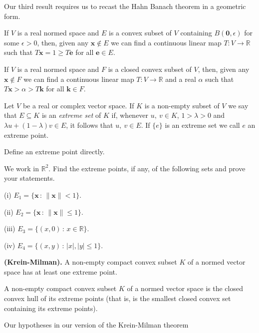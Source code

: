 Our third result requires us to recast 
the Hahn Banach theorem in a geometric form.
\begin{lemma}\label{L;geometrical Banach} 
If $V$ is a real normed space
and $E$ is a convex subset of $V$ containing
$B({\boldsymbol 0},\epsilon)$ for some $\epsilon>0$,
then, given any ${\mathbf x}\notin E$ we can find
a continuous linear map $T:V\rightarrow{\mathbb R}$
such that $T{\mathbf x}=1\geq T{\mathbf e}$ for
all ${\mathbf e}\in E$.
\end{lemma}
\begin{theorem} 
If $V$ is a real normed space
and $F$ is a closed convex subset of $V$,
then, given any ${\mathbf x}\notin F$ we can find
a continuous linear map $T:V\rightarrow{\mathbb R}$
and a real $\alpha$
such that $T{\mathbf x}>\alpha>T{\mathbf k}$ for
all ${\mathbf k}\in F$.
\end{theorem}
\begin{definition} Let $V$ be a real or complex
vector space. If $K$ is a non-empty subset of $V$
we say that $E\subseteq K$ is an \emph{extreme set}
of $K$ if, whenever $u,\ v\in K$, $1>\lambda>0$
and $\lambda u+(1-\lambda)v\in E$, it follows that
$u,\ v\in E$. If $\{e\}$ is an extreme set we
call $e$ an extreme point.
\end{definition}
\begin{exercise} Define an extreme point directly.
\end{exercise}
\begin{exercise} We work in ${\mathbb R}^{2}$.
Find the extreme points, if any, of the following sets
and prove your statements.

(i) $E_{1}=\{{\mathbf x}\,:\,\|{\mathbf x}\|<1\}$.
 
(ii) $E_{2}=\{{\mathbf x}\,:\,\|{\mathbf x}\|\leq 1\}$.

(iii) $E_{3}=\{(x,0)\,:\,x\in{\mathbb R}\}$.

(iv) $E_{4}=\{(x,y)\,:\,|x|,|y|\leq 1\}$.
\end{exercise}
\begin{theorem}{\bf (Krein-Milman).} A non-empty
compact convex subset $K$ of a normed vector space
has at least one extreme point.
\end{theorem}
\begin{theorem} A non-empty
compact convex subset $K$ of a normed vector space
is the closed convex hull of its extreme points
(that is, is the smallest closed convex set
containing its extreme points).
\end{theorem}
Our hypotheses in our version of the Krein-Milman theorem
